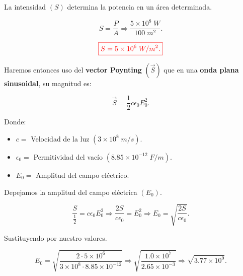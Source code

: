 \documentclass[a4paper,12pt]{article} %
\begin{document}
\begin{justify}
    La intensidad \((S)\) determina la potencia en un área determinada.
\end{justify}

\[ S = \frac{P}{A} \Rightarrow \frac{5 \times 10^8 \; W }{100 \; m^2}. \]

\vspace{\baselineskip}

\[ \textcolor{red}{\boxed{S = 5 \times 10^6 \; W/m^2 .}} \]

\vspace{\baselineskip}

\begin{justify}
    Haremos entonces uso del \textbf{ vector Poynting} \((\vec{S})\) que en una \textbf{onda plana sinusoidal}, su magnitud es:
\end{justify}

\[ \vec{S} = \frac{1}{2} c \epsilon_0 E^2_0 . \]

\begin{justify}
    Donde:
\end{justify}

\begin{itemize}
    \item \( c = \) Velocidad de la luz \( \left(3 \times 10^8 \; m/s\right) .\)
    \item \( \epsilon_0 = \) Permitividad del vacío \( \left(8.85 \times 10^{-12} \; F/m \right).\)
    \item \( E_0 = \) Amplitud del campo eléctrico.
\end{itemize}

\begin{justify}
    Depejamos la amplitud del campo eléctrica \((E_0)\).
\end{justify}

\[ \frac{S}{\frac{1}{2}} = c \epsilon_0 E^2_0 \Rightarrow \frac{2S}{c \epsilon_0} = E^2_0 \Rightarrow E_0 = \sqrt{\frac{2S}{c \epsilon_0}}. \]

\vspace{\baselineskip}

\begin{justify}
    Sustituyendo por nuestro valores.
\end{justify}

\[ E_0 = \sqrt{\frac{2 \cdot 5 \times 10^6}{3 \times 10^8 \cdot 8.85 \times 10^{-12}}} \Rightarrow \sqrt{\frac{1.0 \times 10^7}{2.65 \times 10^{-3}}} \Rightarrow \sqrt{3.77 \times 10^9}. \]

\vspace{\baselineskip}
\end{document}
